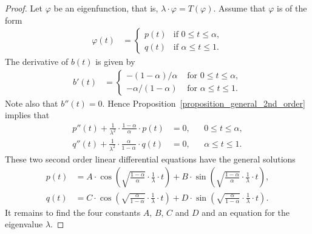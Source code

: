 \documentclass[10pt,a4paper]{amsart}
\begin{document}
\begin{proof}
Let $\varphi$ be an eigenfunction,
that is, $\lambda \cdot \varphi = T(\varphi)$.
Assume that $\varphi$ is of the form
\begin{align*}
\varphi(t)
& =
\begin{cases}
p(t) & \text{if } 0 \leq t \leq \alpha , \\
q(t) & \text{if } \alpha \leq t \leq 1 .
\end{cases}
\end{align*}
The derivative of $b(t)$ is given by
\begin{align*}
b'(t)
& = 
\begin{cases}
-(1-\alpha)/\alpha & \text{ for } 0 \leq t \leq \alpha, \\
-\alpha/(1-\alpha) & \text{ for } \alpha \leq t \leq 1 .
\end{cases}
\end{align*}
Note also that $b''(t) = 0$.
Hence Proposition~\ref{proposition_general_2nd_order}
implies that
\begin{align*}
p''(t) 
+
\frac{1}{\lambda^{2}} \cdot \frac{1-\alpha}{\alpha} \cdot p(t) 
& =
0 ,
&&
0 \leq t \leq \alpha,
\\
q''(t)
+
\frac{1}{\lambda^{2}} \cdot \frac{\alpha}{1-\alpha} \cdot q(t) 
& =
0 ,
&&
\alpha \leq t \leq 1.
\end{align*}
These two second order linear differential equations
have the general solutions
\begin{align}
p(t)
& =
A \cdot \cos\left( \sqrt{\frac{1-\alpha}{\alpha}} \cdot \frac{1}{\lambda} \cdot  t \right)
+
B \cdot \sin\left( \sqrt{\frac{1-\alpha}{\alpha}} \cdot \frac{1}{\lambda} \cdot t \right) ,
\label{equation_p_explicit_A_B}
\\
q(t)
& =
C \cdot \cos\left( \sqrt{\frac{\alpha}{1-\alpha}} \cdot \frac{1}{\lambda} \cdot  t \right)
+
D \cdot \sin\left( \sqrt{\frac{\alpha}{1-\alpha}} \cdot \frac{1}{\lambda} \cdot t \right) .
\label{equation_q_explicit_C_D}
\end{align}
It remains to find the four constants $A$, $B$, $C$ and $D$
and an equation for the eigenvalue $\lambda$.


\end{proof}
\end{document}
